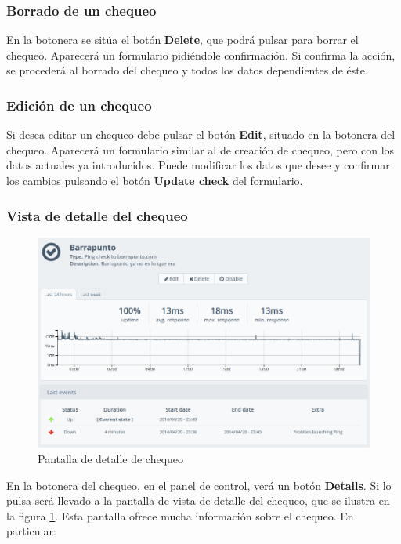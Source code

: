 \subsubsection{Borrado de un chequeo}

En la botonera se sitúa el botón \textbf{Delete}, que podrá pulsar para borrar
el chequeo. Aparecerá un formulario pidiéndole confirmación. Si confirma la
acción, se procederá al borrado del chequeo y todos los datos dependientes de
éste.

\subsubsection{Edición de un chequeo}

Si desea editar un chequeo debe pulsar el botón \textbf{Edit}, situado en la
botonera del chequeo. Aparecerá un formulario similar al de creación de chequeo,
pero con los datos actuales ya introducidos. Puede modificar los datos que desee
y confirmar los cambios pulsando el botón \textbf{Update check} del formulario.

\subsubsection{Vista de detalle del chequeo}

\begin{figure}[hbtp]
  \centering
  \includegraphics[width=\textwidth]{apendice_manual_usuario/pantalla_detalle_chequeo.png}
  \caption{Pantalla de detalle de chequeo}
  \label{fig:detalle-chequeo}
\end{figure}

En la botonera del chequeo, en el panel de control, verá un botón
\textbf{Details}. Si lo pulsa será llevado a la pantalla de vista de detalle del
chequeo, que se ilustra en la figura \ref{fig:detalle-chequeo}. Esta pantalla
ofrece mucha información sobre el chequeo. En particular:


